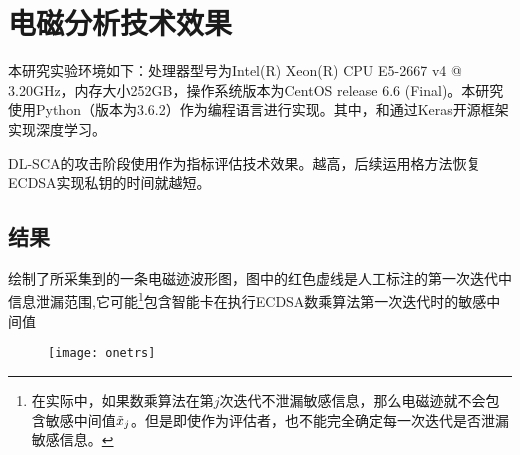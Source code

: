 {{	\section{电磁分析技术效果}\label{sec:ecdsaresult}
	本研究实验环境如下：处理器型号为Intel(R) Xeon(R) CPU E5-2667 v4 @ 3.20GHz，内存大小252GB，操作系统版本为CentOS release 6.6 (Final)。本研究使用Python（版本为3.6.2）作为编程语言进行实现。其中，\shujuzengqiang 和\jiashejianyanguji 通过Keras开源框架实现深度学习。
	
	DL-SCA的攻击阶段使用\zyx 作为指标评估技术效果。\zyx 越高，后续运用格方法恢复ECDSA实现私钥的时间就越短。
	
	\subsection{\yuchuli 结果}
	
	绘制了所采集到的一条电磁迹波形图，图中的红色虚线是人工标注的第一次迭代中信息泄漏范围,它可能\footnote{在实际中，如果数乘算法在第$j$次迭代不泄漏敏感信息，那么电磁迹就不会包含敏感中间值$\tilde {x}_j$。但是即使作为评估者，也不能完全确定每一次迭代是否泄漏敏感信息。}包含智能卡在执行ECDSA数乘算法第一次迭代时的敏感中间值%
	
	\begin{figure}[!h]
		\begin{center}
			\texttt{[image: onetrs]}
			\label{fig:onetrs}
		\end{center}
	\end{figure}
	
}}

